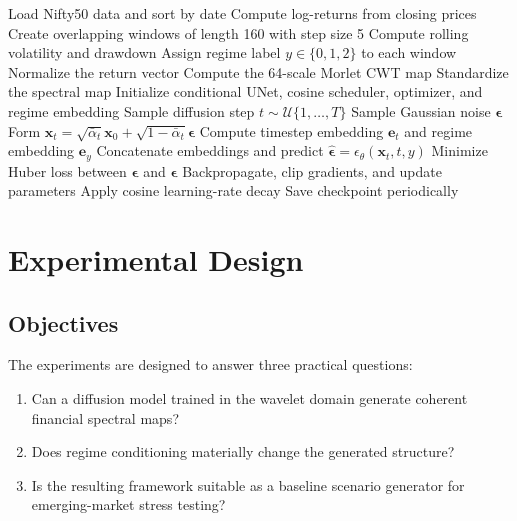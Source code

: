 \documentclass[conference]{IEEEtran}
\begin{document}
\begin{algorithm}[!t]
\caption{Training Procedure for Regime-Aware Spectral Diffusion}
\label{alg:training}
\begin{algorithmic}[1]
\State Load Nifty50 data and sort by date
\State Compute log-returns from closing prices
\State Create overlapping windows of length 160 with step size 5
\State Compute rolling volatility and drawdown
\State Assign regime label $y \in \{0,1,2\}$ to each window
    \State Normalize the return vector
    \State Compute the 64-scale Morlet CWT map
    \State Standardize the spectral map
\EndFor
\State Initialize conditional UNet, cosine scheduler, optimizer, and regime embedding
        \State Sample diffusion step $t \sim \mathcal{U}\{1,\dots,T\}$
        \State Sample Gaussian noise $\boldsymbol{\epsilon}$
        \State Form $\mathbf{x}_t = \sqrt{\bar{\alpha}_t}\mathbf{x}_0 + \sqrt{1-\bar{\alpha}_t}\boldsymbol{\epsilon}$
        \State Compute timestep embedding $\mathbf{e}_t$ and regime embedding $\mathbf{e}_y$
        \State Concatenate embeddings and predict $\hat{\boldsymbol{\epsilon}} = \epsilon_{\theta}(\mathbf{x}_t, t, y)$
        \State Minimize Huber loss between $\boldsymbol{\epsilon}$ and $\hat{\boldsymbol{\epsilon}}$
        \State Backpropagate, clip gradients, and update parameters
    \EndFor
    \State Apply cosine learning-rate decay
    \State Save checkpoint periodically
\EndFor
\end{algorithmic}
\end{algorithm}

\section{Experimental Design}
\subsection{Objectives}
The experiments are designed to answer three practical questions:
\begin{enumerate}
    \item Can a diffusion model trained in the wavelet domain generate coherent financial spectral maps?
    \item Does regime conditioning materially change the generated structure?
    \item Is the resulting framework suitable as a baseline scenario generator for emerging-market stress testing?
\end{enumerate}
\end{document}
